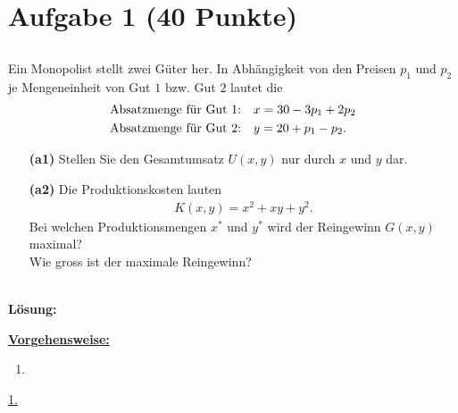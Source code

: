 \vspace{1cm}
\renewcommand{\labelenumi}{\theenumi.}
\section*{Aufgabe 1 (40 Punkte)}
\vspace{0.4cm}
\subsection*{}
Ein Monopolist stellt zwei Güter her.
In Abhängigkeit von den Preisen $ p_1 $ und $ p_2 $ je Mengeneinheit von Gut $ 1 $ bzw. Gut $ 2 $ lautet die
\begin{align*}
	&\textrm{Absatzmenge für Gut $ 1 $:} \quad 
	x = 30 - 3 p_1 + 2 p_2\\
	&\textrm{Absatzmenge für Gut $ 2 $:} \quad
	y = 20 + p_1 - p_2.
\end{align*}
\begin{enumerate}
	\item[\textbf{(a1)}]
	Stellen Sie den Gesamtumsatz $ U(x,y) $ nur durch $ x $ und $ y  $ dar.
	\item[\textbf{(a2)}] 
	Die Produktionskosten lauten
	\begin{align*}
		K(x,y) = x^2 + xy + y^2.
	\end{align*}
	Bei welchen Produktionsmengen $ x^\ast  $ und $ y^\ast $ wird der Reingewinn $ G(x,y) $ maximal?\\
	Wie gross ist der maximale Reingewinn?
\end{enumerate}
\ \\

\textbf{Lösung:}
\begin{mdframed}
\underline{\textbf{Vorgehensweise:}}
\renewcommand{\labelenumi}{\theenumi.}
\begin{enumerate}
\item  
\end{enumerate}
\end{mdframed}
\underline{1. }\\






\newpage

